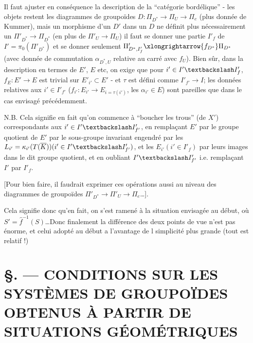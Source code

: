 Il faut ajuster en conséquence la description de la ``catégorie bordélique'' - les objets restent les diagrammes de groupoïdes $D: \Pi_{D^*} \to \Pi_U \to \Pi_e$ (plus donnée de Kummer), mais un morphisme d'un $D'$ dans un $D$ ne définit plus nécessairement un $\Pi'_{D^*} \to \Pi_{D^*}$ (en plus de $\Pi'_U \to \Pi_U$) il faut se donner une partie $I'_f$ de $I' = \pi_0(\Pi'_{D^*})$ et se donner seulement $\Pi'_{D^*, I'_f} \xlongrightarrow{f_{D^*}} \Pi_{D^*}$ (avec donnée de commutation $\alpha_{D^*, U}$ relative au carré avec $f_U$). Bien sûr, dans la description en termes de $E'$, $E$ etc, on exige que pour $i' \in I' \textbackslash I'_f$, $f_E: E' \to E$ est trivial sur $E'_{i'} \subset  E'$ - et $\tau$ est défini comme $I'_{f'} \to I$; les données relatives aux $i' \in I'_{f'}$ ($f_{i'}: E_{i'} \to E_{i = \tau(i')}$, les $\alpha_{i'} \in E$) sont pareilles que dans le cas envisagé précédemment.

N.B. Cela signifie en fait qu'on commence à ``boucher les trous'' (de $X'$) correspondants aux $i' \in I' \textbackslash I'_{f'}$, en rempla\c{c}ant $E'$ par le groupe quotient de $E'$ par le sous-groupe invariant engendré par les $L_{i'} = \kappa_{i'}(T(\overline{K})) (i' \in I' \textbackslash I'_{f'})$, et les $E_{i'} (i' \in I'_f)$ par leurs images dans le dit groupe quotient, et en oubliant $I' \textbackslash I'_{f'}$ i.e. rempla\c{c}ant $I'$ par $I'_f$.

[Pour bien faire, il faudrait exprimer ces opérations aussi au niveau des diagrammes de groupoïdes $\Pi'_{D^*} \to \Pi'_U \to \Pi_e$\dots].

Cela signifie donc qu'en fait, on s'est ramené à la situation envisagée au début, où $S' = \hat{f}^{-1}(S)$\dots Donc finalement la différence des deux points de vue n'est pas énorme, et celui adopté au début a l'avantage de l simplicité plus grande (tout est relatif !)














\chapter*{\S {}. --- CONDITIONS SUR LES SYSTÈMES DE GROUPOÏDES OBTENUS À PARTIR DE SITUATIONS GÉOMÉTRIQUES}\thispagestyle{empty}
\label{sec:11}
